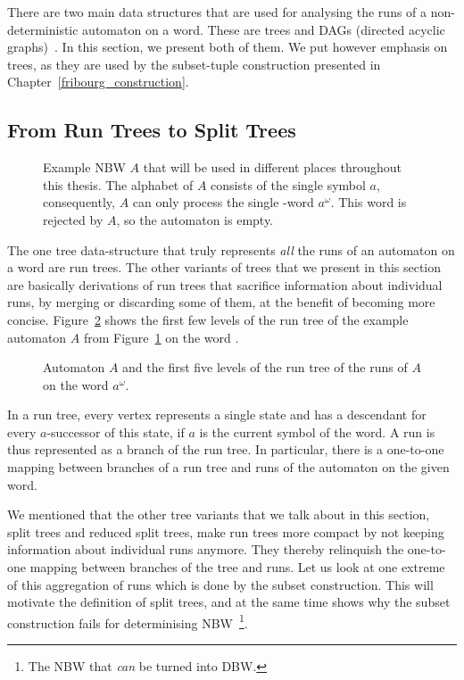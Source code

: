 There are two main data structures that are used for analysing the runs of a non-deterministic automaton on a word. These are trees and DAGs (directed acyclic graphs)~\cite{2014_wilke}. In this section, we present both of them. We put however emphasis on trees, as they are used by the subset-tuple construction presented in Chapter~\ref{fribourg_construction}.

\subsection{From Run Trees to Split Trees}

\begin{figure}
\centering
\Automaton
\caption{Example NBW $A$ that will be used in different places throughout this thesis. The alphabet of $A$ consists of the single symbol $a$, consequently, $A$ can only process the single \om-word $a^\omega$. This word is rejected by $A$, so the automaton is empty.}
\label{automaton}
\end{figure}

The one tree data-structure that truly represents \emph{all} the runs of an automaton on a word are run trees. The other variants of trees that we present in this section are basically derivations of run trees that sacrifice information about individual runs, by merging or discarding some of them, at the benefit of becoming more concise. Figure~\ref{run_tree} shows the first few levels of the run tree of the example automaton $A$ from Figure~\ref{automaton} on the word \aom.

\begin{figure}
\centering
\RunTree
\caption{Automaton $A$ and the first five levels of the run tree of the runs of $A$ on the word $a^\omega$.}
\label{run_tree}
\end{figure}

In a run tree, every vertex represents a single state and has a descendant for every $a$-successor of this state, if $a$ is the current symbol of the word. A run is thus represented as a branch of the run tree. In particular, there is a one-to-one mapping between branches of a run tree and runs of the automaton on the given word.

We mentioned that the other tree variants that we talk about in this section,  split trees and reduced split trees, make run trees more compact by not keeping information about individual runs anymore. They thereby relinquish the one-to-one mapping between branches of the tree and runs. Let us look at one extreme of this aggregation of runs which is done by the subset construction. This will motivate the definition of split trees, and at the same time shows why the subset construction fails for determinising NBW~\footnote{The NBW that \emph{can} be turned into DBW.}.

